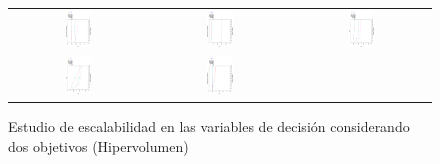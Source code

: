 %
\begin{figure}[H]
\centering
\caption{Estudio de escalabilidad en las variables de decisión considerando dos objetivos (Hipervolumen)}
\label{fig:Scalability_Study_HV_1_exp}
\begin{tabular}{ccc}
   \includegraphics[width=0.2\textwidth, angle=-90,origin=c]{Figures_Chapter7/Results_Chapter3/DTLZ4_2obj_Scalability.eps} &
    \includegraphics[width=0.2\textwidth, angle=-90,origin=c]{Figures_Chapter7/Results_Chapter3/DTLZ7_2obj_Scalability.eps} &
    \includegraphics[width=0.2\textwidth,angle=-90,origin=c]{Figures_Chapter7/Results_Chapter3/UF7_Scalability.eps}  
    \\
       \includegraphics[width=0.2\textwidth, angle=-90,origin=c]{Figures_Chapter7/Results_Chapter3/UF5_Scalability.eps} &
    \includegraphics[width=0.2\textwidth, angle=-90,origin=c]{Figures_Chapter7/Results_Chapter3/WFG2_2obj_Scalability.eps} &

\end{tabular}
\end{figure}

